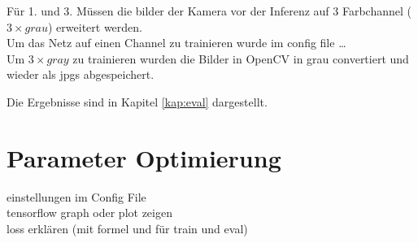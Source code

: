Für 1. und 3. Müssen die bilder der Kamera vor der 
Inferenz auf 3 Farbchannel ($3 \times grau$) erweitert werden.
\\
Um das Netz auf einen Channel zu trainieren wurde im config file \dots
\\
Um $3 \times gray$ zu trainieren wurden die Bilder in OpenCV in 
grau convertiert und wieder als jpgs abgespeichert.

Die Ergebnisse sind in Kapitel \ref{kap:eval} dargestellt.


\section{Parameter Optimierung}
einstellungen im Config File\\
tensorflow graph oder plot zeigen\\
loss erklären (mit formel und für train und eval)


